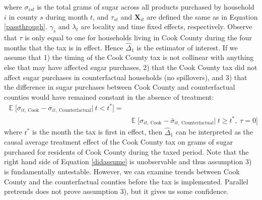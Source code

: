 \documentclass[12pt]{article}
\begin{document}
where $\sigma_{ist}$ is the total grams of sugar across all products purchased by household $i$ in county $s$ during month $t$, and $\tau_{st}$ and $\mathbf{X}_{it}$ are defined the same as in Equation \ref{passthrough}. $\gamma_s$ and $\lambda_t$ are locality and time fixed effects, respectively. Observe that $\tau$ is only equal to one for households living in Cook County during the four months that the tax is in effect. Hence $\hat{\Delta}_1$ is the estimator of interest. If we assume that 1) the timing of the Cook County tax is not collinear with anything else that may have affected sugar purchases, 2) that the Cook County tax did not affect sugar purchases in counterfactual households (no spillovers), and 3) that the difference in sugar purchases between Cook County and counterfactual counties would have remained constant in the absence of treatment:
\begin{equation}
\begin{split}
\mathop{{}\mathbb{E}}\big[\sigma_{it,\: \text{Cook}} - \sigma_{it,\: \text{Counterfactual}}  |\: t<t^*\big] = \\
& \mathop{{}\mathbb{E}}\big[\sigma_{it,\: \text{Cook}} - \bar{\sigma}_{it,\: \text{Counterfactual}}  |\: t\geq t^*,\; \tau = 0\big] \label{didassume}
\end{split}
\end{equation}
where $t^*$ is the month the tax is first in effect, then $\hat{\Delta}_1$ can be interpreted as the causal average treatment effect of the Cook County tax on grams of sugar purchased for residents of Cook County during the taxed period. Note that the right hand side of Equation \ref{didassume} is unobservable and thus assumption 3) is fundamentally untestable. However, we can examine trends between Cook County and the counterfactual counties before the tax is implemented. Parallel pretrends does not prove assumption 3), but it gives us some confidence.

\end{document}
